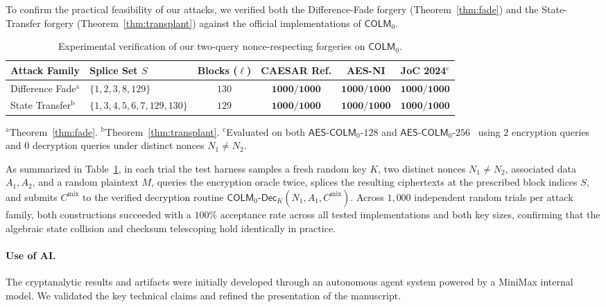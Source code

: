 \documentclass[11pt,a4paper]{article}
\theoremstyle{definition}
\theoremstyle{remark}
\newcommand{\COLMzero}{\mathsf{COLM}_0}
\begin{document}
To confirm the practical feasibility of our attacks, we verified both the Difference-Fade forgery (Theorem~\ref{thm:fade}) and the State-Transfer forgery (Theorem~\ref{thm:transplant}) against the official implementations of $\COLMzero$.

\begin{table}[t]
\centering
\caption{Experimental verification of our two-query nonce-respecting forgeries on $\COLMzero$.}
\label{tab:experiments}
\small
\setlength{\tabcolsep}{0pt}
\begin{tabular*}{\textwidth}{@{\extracolsep{\fill}}llcccc@{}}
\toprule
\textbf{Attack Family} & \textbf{Splice Set $S$} & \textbf{Blocks ($\ell$)} & \textbf{CAESAR Ref.} & \textbf{AES-NI} & \textbf{JoC 2024}$^{\mathrm{c}}$ \\
\midrule
Difference Fade$^{\mathrm{a}}$ & $\{1, 2, 3, 8, 129\}$ & $130$ & $\mathbf{1000/1000}$ & $\mathbf{1000/1000}$ & $\mathbf{1000/1000}$ \\
State Transfer$^{\mathrm{b}}$ & $\{1, 3, 4, 5, 6, 7, 129, 130\}$ & $129$ & $\mathbf{1000/1000}$ & $\mathbf{1000/1000}$ & $\mathbf{1000/1000}$ \\
\bottomrule
\end{tabular*}
\vspace{3pt}
\parbox{\textwidth}{\footnotesize
$^{\mathrm{a}}$Theorem~\ref{thm:fade}.\quad
$^{\mathrm{b}}$Theorem~\ref{thm:transplant}.\quad
$^{\mathrm{c}}$Evaluated on both $\mathsf{AES\text{-}COLM}_0\text{-}128$ and $\mathsf{AES\text{-}COLM}_0\text{-}256$~\cite{COLM24} using $2$ encryption queries and $0$ decryption queries under distinct nonces $N_1 \neq N_2$.}
\end{table}

As summarized in Table~\ref{tab:experiments}, in each trial the test harness samples a fresh random key $K$, two distinct nonces $N_1 \neq N_2$, associated data $A_1, A_2$, and a random plaintext $M$, queries the encryption oracle twice, splices the resulting ciphertexts at the prescribed block indices $S$, and submits $C^{\mathrm{mix}}$ to the verified decryption routine $\mathsf{COLM}_0\text{-}\mathsf{Dec}_K(N_1, A_1, C^{\mathrm{mix}})$. Across $1{,}000$ independent random trials per attack family, both constructions succeeded with a $100\%$ acceptance rate across all tested implementations and both key sizes, confirming that the algebraic state collision and checksum telescoping hold identically in practice.

\paragraph{Use of AI.}
The cryptanalytic results and artifacts were initially developed through an autonomous agent system powered by a MiniMax internal model. We validated the key technical claims and refined the presentation of the manuscript.
\end{document}
